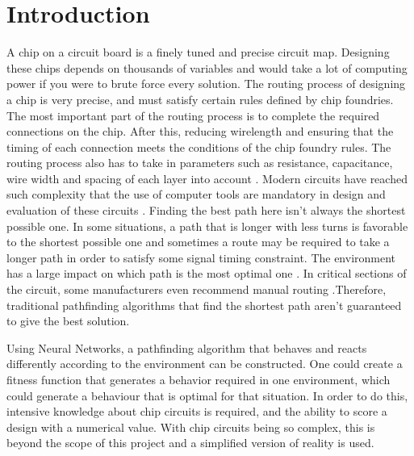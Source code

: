 \documentclass{kththesis}
\begin{document}
 
\tableofcontents
 
 
\mainmatter
 
 
\chapter{Introduction}
 
A chip on a circuit board is a finely tuned and precise circuit map. Designing these chips depends on thousands of variables and would take a lot of computing power if you were to brute force every solution. The routing process of designing a chip is very precise, and must satisfy certain rules defined by chip foundries. The most important part of the routing process is to complete the required connections on the chip. After this, reducing wirelength and ensuring that the timing of each connection meets the conditions of the chip foundry rules. The routing process also has to take in parameters such as resistance, capacitance, wire width and spacing of each layer into account \parencite{EDA_routing}. Modern circuits have reached such complexity that the use of computer tools are mandatory in design and evaluation of these circuits \parencite{Digital_Integrated_Circuits}. Finding the best path here isn’t always the shortest possible one. In some situations, a path that is longer with less turns is favorable to the shortest possible one and sometimes a route may be required to take a longer path in order to satisfy some signal timing constraint. The environment has a large impact on which path is the most optimal one \parencite{PCBROUTERS}. In critical sections of the circuit, some manufacturers even recommend manual routing \parencite{NI}.Therefore, traditional pathfinding algorithms that find the shortest path aren’t guaranteed to give the best solution.
 
Using Neural Networks, a pathfinding algorithm that behaves and reacts differently according to the environment can be constructed. One could create a fitness function that generates a behavior required in one environment, which could generate a behaviour that is optimal for that situation. In order to do this, intensive knowledge about chip circuits is required, and the ability to score a design with a numerical value. With chip circuits being so complex, this is beyond the scope of this project and a simplified version of reality is used.
 
 
 
 
 
\end{document}
